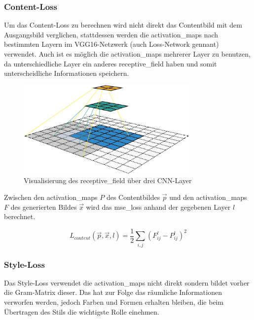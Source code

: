 \subsubsection{Content-Loss}
\label{sec:content_loss}

Um das Content-Loss zu berechnen wird nicht direkt das Contentbild mit dem Ausgangsbild verglichen, stattdessen werden die \gls{activation_map}s nach bestimmten Layern im VGG16-Netzwerk (auch Loss-Network gennant) verwendet. Auch ist es möglich die \gls{activation_map}s mehrerer Layer zu benutzen, da unterschiedliche Layer ein anderes \gls{receptive_field} haben und somit unterscheidliche Informationen speichern.

\begin{figure}[H]
	\centering
	\includegraphics[width=0.79\textwidth]{resources/content/receptive_field.png}
	\caption{Visualisierung des \gls{receptive_field} über drei CNN-Layer \cite{receptive_field_img}}
	\label{img:receptive_field_img}
\end{figure}

Zwischen den \gls{activation_map}s $ P $  des Contentbildes $ \vec{p} $ und den \gls{activation_map}s $ F $ des generierten Bildes $ \vec{x} $ wird das \gls{mse_loss} anhand der gegebenen Layer $ l $ berechnet.

\begin{equation}
	\label{eq:content_loss}
    L_{content} ( \vec{p}, \vec{x}, l ) = \frac{1}{2} \sum_{i, j} (F_{ij}^{l} - P_{ij}^{l})^2
\end{equation}

\subsubsection{Style-Loss}
\label{sec:style_loss}

Das Style-Loss verwendet die \gls{activation_map}s nicht direkt sondern bildet vorher die Gram-Matrix dieser. Das hat zur Folge das räumliche Informationen verworfen werden, jedoch Farben und Formen erhalten bleiben, die beim Übertragen des Stils die wichtigste Rolle einehmen.


